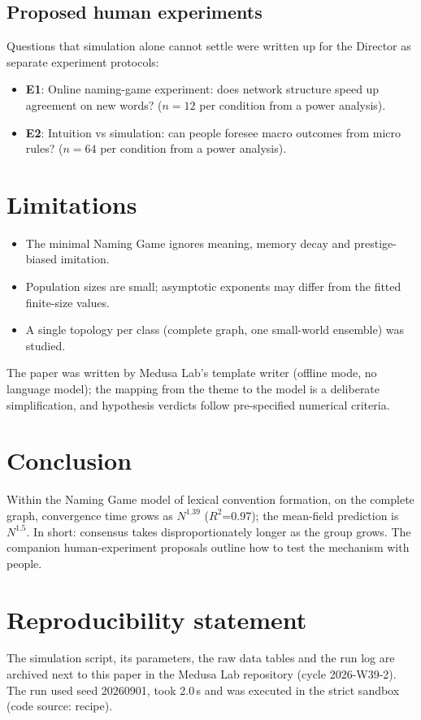 \documentclass[11pt,a4paper]{article}
\begin{document}
\subsection*{Proposed human experiments}
Questions that simulation alone cannot settle were written up for the Director as separate experiment protocols:
\begin{itemize}
  \item \textbf{E1}: Online naming-game experiment: does network structure speed up agreement on new words? ($n = 12$ per condition from a power analysis).
  \item \textbf{E2}: Intuition vs simulation: can people foresee macro outcomes from micro rules? ($n = 64$ per condition from a power analysis).
\end{itemize}
\section{Limitations}
\begin{itemize}
  \item The minimal Naming Game ignores meaning, memory decay and prestige-biased imitation.
  \item Population sizes are small; asymptotic exponents may differ from the fitted finite-size values.
  \item A single topology per class (complete graph, one small-world ensemble) was studied.
\end{itemize}

The paper was written by Medusa Lab's template writer (offline mode, no language model); the mapping from the theme to the model is a deliberate simplification, and hypothesis verdicts follow pre-specified numerical criteria.

\section{Conclusion}
Within the Naming Game model of lexical convention formation, on the complete graph, convergence time grows as $N^{1.39}$ ($R^{2}$=0.97); the mean-field prediction is $N^{1.5}$. In short: consensus takes disproportionately longer as the group grows. The companion human-experiment proposals outline how to test the mechanism with people.

\section*{Reproducibility statement}
The simulation script, its parameters, the raw data tables and the run log are archived next to this paper in the
Medusa Lab repository (cycle 2026-W39-2). The run used seed 20260901, took 2.0\,s and was
executed in the strict sandbox (code source: recipe).
\end{document}

